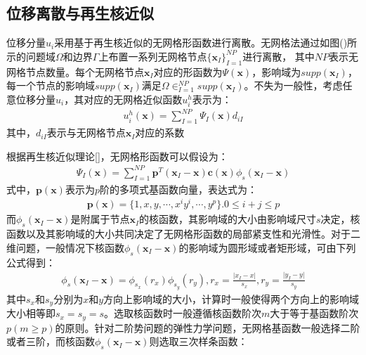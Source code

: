 \subsection{位移离散与再生核近似}
位移分量$u_i$采用基于再生核近似的无网格形函数进行离散。无网格法通过如图()所示的问题域$\Omega$和边界$\Gamma$上布置一系列无网格节点$\{\pmb{x}_I\}^{N\!P}_{I=1}$进行离散，
其中$N\!P$表示无网格节点数量。每个无网格节点$\pmb{x}_I$对应的形函数为$\Psi(\pmb{x})$，影响域为$supp(\pmb{x}_I)$，
每一个节点的影响域$supp(\pmb{x}_I)$满足$\Omega\in^{N\!P}_{I=1}supp(\pmb{x}_I)$。不失为一般性，考虑任意位移分量$u_i$，其对应的无网格近似函数$u^h_i$表示为：
\begin{equation}\label{ui}
\begin{split}
    u^h_i(\pmb{x})=\sum_{I=1}^{N\!P}\Psi_I(\pmb{x})d_{iI}
\end{split}
\end{equation}
其中，$d_{iI}$表示与无网格节点$\pmb{x}_I$对应的系数\par
根据再生核近似理论[]，无网格形函数可以假设为：
\begin{equation}\label{shapefunction}
\begin{split}
    \Psi_I(\pmb{x})=\sum_{I=1}^{N\!P}\pmb{p}^T(\pmb{x}_I-\pmb{x})\pmb{c}(\pmb{x})\phi_s(\pmb{x}_I-\pmb{x})
\end{split}
\end{equation}
式中，$\pmb{p}(\pmb{x})$表示为$p$阶的多项式基函数向量，表达式为：
\begin{equation}
\begin{split}
    \pmb{p}(\pmb{x})=\{1,x,y,\dotsb,x^iy^i,\dotsb,y^p\}.0\le i+j \le p
\end{split}
\end{equation}
而$\phi_s(\pmb{x}_I-\pmb{x})$是附属于节点$\pmb{x}_I$的核函数，其影响域的大小由影响域尺寸$s$决定，核函数以及其影响域的大小共同决定了无网格形函数的局部紧支性和光滑性。对于二维问题，一般情况下核函数$\phi_s(\pmb{x}_I-\pmb{x})$的影响域为圆形域或者矩形域，可由下列公式得到：
\begin{equation}
\begin{split}
    \phi_s(\pmb{x}_I-\pmb{x})=\phi_{s_x}(r_x)\phi_{s_y}(r_y),r_x=\frac{\lvert x_I-x\rvert}{s_x},r_y=\frac{\lvert y_I-y \rvert}{s_y}
\end{split}
\end{equation}
其中$s_x$和$s_y$分别为$x$和$y$方向上影响域的大小，计算时一般使得两个方向上的影响域大小相等即$s_x=s_y=s$。选取核函数时一般遵循核函数阶次$m$大于等于基函数阶次$p(m\ge p)$的原则。针对二阶势问题的弹性力学问题，无网格基函数一般选择二阶或者三阶，而核函数$\phi_s(\pmb{x}_I-\pmb{x})$则选取三次样条函数：
